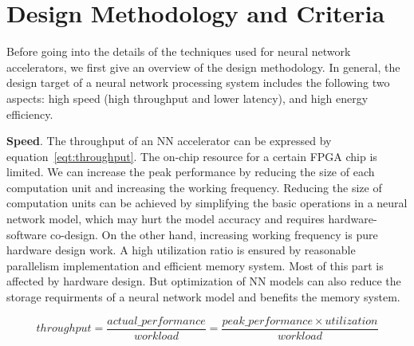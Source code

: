 \section{Design Methodology and Criteria}\label{sec:design_method}

Before going into the details of the techniques used for neural network accelerators, we first give an overview of the design methodology. In general, the design target of a neural network processing system includes the following two aspects: high speed (high throughput and lower latency), and high energy efficiency.

\textbf{Speed}. The throughput of an NN accelerator can be expressed by equation~\ref{eqt:throughput}.  The on-chip resource for a certain FPGA chip is limited. We can increase the peak performance by reducing the size of each computation unit and increasing the working frequency. Reducing the size of computation units can be achieved by simplifying the basic operations in a neural network model, which may hurt the model accuracy and requires hardware-software co-design. On the other hand, increasing working frequency is pure hardware design work. A high utilization ratio is ensured by reasonable parallelism implementation and efficient memory system. Most of this part is affected by hardware design. But optimization of NN models can also reduce the storage requirments of a neural network model and benefits the memory system.

\begin{equation}\label{eqt:throughput}
    throughput = \frac{actual\_performance}{workload} = \frac{peak\_performance \times utilization}{workload}
\end{equation}


